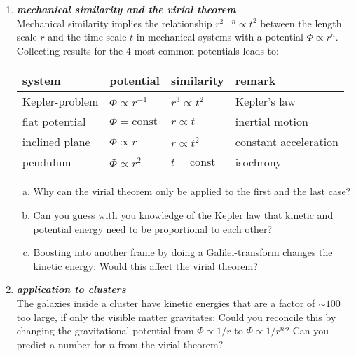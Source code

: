 \documentclass[a4paper,12pt]{article}
\newcommand{\question}[1]{\textbf{\textit{#1}}}
\begin{document}
\begin{enumerate}
\item \question{mechanical similarity and the virial theorem}\\
Mechanical similarity implies the relationship $r^{2-n}\propto t^2$ between the length scale $r$ and the time scale $t$ in mechanical systems with a potential $\Phi\propto r^n$. Collecting results for the 4 most common potentials leads to:

\begin{table}[h]
\begin{center}
\begin{tabular}{|l|lll|}
\hline
system & potential & similarity & remark\\
\hline
Kepler-problem & $\Phi\propto r^{-1}$ & $r^3\propto t^2$ & Kepler's law\\
flat potential & $\Phi=\mathrm{const}$ & $r\propto t$ & inertial motion\\
inclined plane & $\Phi\propto r$ & $r\propto t^2$ & constant acceleration\\
pendulum & $\Phi\propto r^2$ & $t = \mathrm{const}$ & isochrony\\
\hline
\end{tabular}
\end{center}
\end{table}

\begin{enumerate}[(a)]
\item{Why can the virial theorem only be applied to the first and the last case?}
\item{Can you guess with you knowledge of the Kepler law that kinetic and potential energy need to be proportional to each other?}
\item{Boosting into another frame by doing a Galilei-transform changes the kinetic energy: Would this affect the virial theorem?}
\end{enumerate}


\item \question{application to clusters}\\
The galaxies inside a cluster have kinetic energies that are a factor of $\sim100$ too large, if only the visible matter gravitates: Could you reconcile this by changing the gravitational potential from $\Phi\propto 1/r$ to $\Phi\propto 1/r^n$? Can you predict a number for $n$ from the virial theorem?


\end{enumerate}
\end{document}
